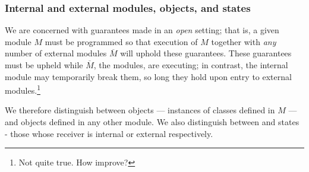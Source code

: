 \subsubsection{Internal and external modules, objects, and states}
 \label{s:concepts}

We are concerned with guarantees made in an \emph{open} setting; that is, a given module
$M$ must be programmed so that 
execution of $M$ together with \emph{any} number of external modules $\overline M$
will uphold these guarantees. %
These guarantees must be upheld while 
 $\overline M$, the  \emph{\externalM} modules, are executing; in contrast, the internal module may 
temporarily break them,
so long they %
hold {upon entry to external modules.}\footnote{Not quite true. How improve?} 
 
    
We therefore distinguish between  \emph{\internalO}
objects --- instances of classes defined in $M$ ---
and \emph{\externalO} objects defined in any other module.
We also distinguish between
  \emph{\internalC} and   \emph{\externalC} states - those whose receiver is internal or external respectively. 
 
 
%




